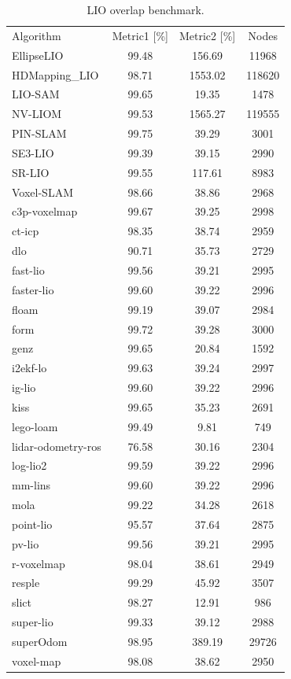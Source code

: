 \begin{table}[]
\centering
\begin{tabular}{lccc}
\rowcolor[HTML]{C0C0C0}
Algorithm & Metric1 [\%] & Metric2 [\%] & Nodes \\
EllipseLIO & 99.48 & 156.69 & 11968 \\
HDMapping_LIO & 98.71 & 1553.02 & 118620 \\
LIO-SAM & 99.65 & 19.35 & 1478 \\
NV-LIOM & 99.53 & 1565.27 & 119555 \\
PIN-SLAM & 99.75 & 39.29 & 3001 \\
SE3-LIO & 99.39 & 39.15 & 2990 \\
SR-LIO & 99.55 & 117.61 & 8983 \\
Voxel-SLAM & 98.66 & 38.86 & 2968 \\
c3p-voxelmap & 99.67 & 39.25 & 2998 \\
ct-icp & 98.35 & 38.74 & 2959 \\
dlo & 90.71 & 35.73 & 2729 \\
fast-lio & 99.56 & 39.21 & 2995 \\
faster-lio & 99.60 & 39.22 & 2996 \\
floam & 99.19 & 39.07 & 2984 \\
form & 99.72 & 39.28 & 3000 \\
genz & 99.65 & 20.84 & 1592 \\
i2ekf-lo & 99.63 & 39.24 & 2997 \\
ig-lio & 99.60 & 39.22 & 2996 \\
kiss & 99.65 & 35.23 & 2691 \\
lego-loam & 99.49 & 9.81 & 749 \\
lidar-odometry-ros & 76.58 & 30.16 & 2304 \\
log-lio2 & 99.59 & 39.22 & 2996 \\
mm-lins & 99.60 & 39.22 & 2996 \\
mola & 99.22 & 34.28 & 2618 \\
point-lio & 95.57 & 37.64 & 2875 \\
pv-lio & 99.56 & 39.21 & 2995 \\
r-voxelmap & 98.04 & 38.61 & 2949 \\
resple & 99.29 & 45.92 & 3507 \\
slict & 98.27 & 12.91 & 986 \\
super-lio & 99.33 & 39.12 & 2988 \\
superOdom & 98.95 & 389.19 & 29726 \\
voxel-map & 98.08 & 38.62 & 2950 \\
\end{tabular}
\caption{LIO overlap benchmark.}
\label{tab:lio_overlap}
\end{table}